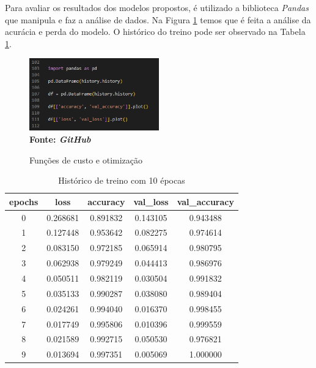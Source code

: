 Para avaliar os resultados dos modelos propostos, é utilizado a biblioteca \textit{Pandas} que manipula e faz a análise de dados. Na Figura \ref{fig:panda} temos que é feita a análise da acurácia e perda do modelo. O histórico do treino pode ser observado na Tabela \ref{tab:history10}.

\begin{figure}[ht]
 	\centering	
 	\caption[\hspace{0.1cm}Grade Computacional.]{Funções de custo e otimização}
 	\vspace{-0.4cm}
 	\includegraphics[width=0.5\textwidth]{figuras/panda.png}
 	\captionsetup{justification=centering}
	\vspace{-0.2cm}
     \\\textbf{\footnotesize Fonte: \textit{GitHub}}
	\label{fig:panda}
\end{figure}

\begin{table}[h]
  \centering
  \caption{Histórico de treino com 10 épocas}
   \label{tab:history10}
\begin{tabular}{|c|c|c|c|c|} 
  \hline
   epochs & loss & accuracy & val\_loss & val\_accuracy \\
  \hline
    0 & 0.268681 & 0.891832 & 0.143105 & 0.943488 \\
    1 & 0.127448 & 0.953642 & 0.082275 & 0.974614 \\
    2 & 0.083150 & 0.972185 & 0.065914 & 0.980795 \\
    3 & 0.062938 & 0.979249 & 0.044413 & 0.986976 \\
    4 & 0.050511 & 0.982119 & 0.030504 & 0.991832 \\
    5 & 0.035133 & 0.990287 & 0.038080 & 0.989404 \\
    6 & 0.024261 & 0.994040 & 0.016370 & 0.998455 \\
    7 & 0.017749 & 0.995806 & 0.010396 & 0.999559 \\
    8 & 0.021589 & 0.992715 & 0.050530 & 0.976821 \\
    9 & 0.013694 & 0.997351 & 0.005069 & 1.000000 \\
  \hline
\end{tabular}

\end{table}

